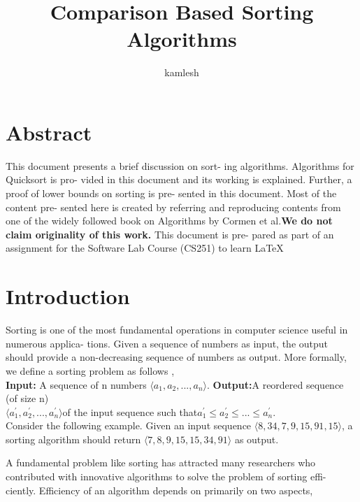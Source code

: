\documentclass[a4paper, 10pt,twocolumn]{article}
\title{Comparison Based Sorting Algorithms}
\author{kamlesh }
\date{}
\begin{document}
\maketitle

\section*{Abstract}

This document presents a brief discussion on sort-
ing algorithms. Algorithms for Quicksort is pro-
vided in this document and its working is explained.
Further, a proof of lower bounds on sorting is pre-
sented in this document. Most of the content pre-
sented here is created by referring and reproducing
contents from one of the widely followed book on
Algorithms by Cormen et al\cite{first}.\textbf{We do not claim
originality of this work.} This document is pre-
pared as part of an assignment for the Software Lab
Course (CS251) to learn \LaTeX{}
\noindent{}
\section{Introduction}
Sorting is one of the most fundamental operations
in computer science useful in numerous applica-
tions. Given a sequence of numbers as input, the
output should provide a non-decreasing sequence
of numbers as output. More formally, we define a
sorting problem as follows \cite{first},\\
\textbf{Input:} A sequence of n numbers $\langle a_1 ,a_2,...,a_n\rangle$.
\textbf{Output:}\hspace{.6cm}A\hspace{.3cm} reordered \hspace{.1cm}sequence\hspace{.5cm} (of size n)\\
$\langle a_1^{'} ,a_2^{'},...,a_n^{'}\rangle$of the input sequence such that$a_1^{'}\leq a_2^{'}\leq ...\leq a_n^{'}$.\\
Consider the following example. Given an input
sequence $\langle8, 34, 7, 9, 15, 91, 15\rangle$, a sorting algorithm
should return $\langle7, 8, 9, 15, 15, 34, 91\rangle$ as output.

A fundamental problem like sorting has attracted
many researchers who contributed with innovative
algorithms to solve the problem of sorting effi-
ciently\cite{three}. Efficiency of an algorithm depends on
primarily on two aspects,
\end{document}
